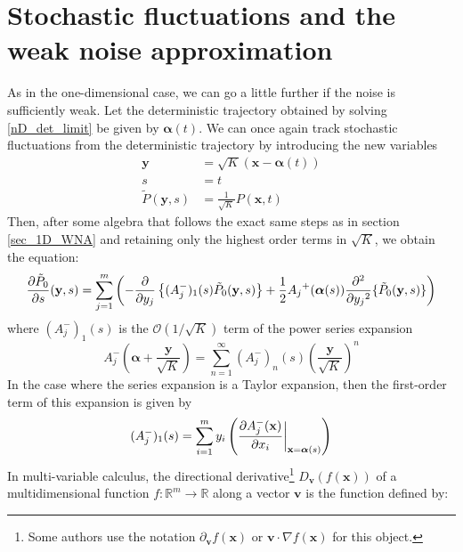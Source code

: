 \section{Stochastic fluctuations and the weak noise approximation}

As in the one-dimensional case, we can go a little further if the noise is sufficiently weak. Let the deterministic trajectory obtained by solving \eqref{nD_det_limit} be given by $\boldsymbol{\alpha}(t)$.  We can once again track 
stochastic fluctuations from the deterministic trajectory by introducing the new variables
\begin{equation}
\begin{aligned}
\mathbf{y} &= \sqrt{K}(\mathbf{x} - \boldsymbol{\alpha}(t))\\
s&=t\\
\tilde{P}(\mathbf{y},s) &= \frac{1}{\sqrt{K}}P(\mathbf{x},t)
\end{aligned}
\end{equation}
Then, after some algebra that follows the exact same steps as in section \ref{sec_1D_WNA} and retaining only the highest order terms in $\sqrt{K}$, we obtain the equation:
\begin{equation}
\label{nD_WNA_intermediate}
\frac{\partial \Tilde{P}_{0}}{\partial s}(\mathbf{y},s) = \sum\limits_{j=1}^{m}\left(-\frac{\partial}{\partial y_j}\left\{(A^{-}_{j})_{1}(s)\Tilde{P}_{0}(\mathbf{y},s)\right\}+\frac{1}{2}{A_j}^{+}(\boldsymbol{\alpha}(s))\frac{\partial^2}{\partial{y_j}^2}\{\Tilde{P}_{0}(\mathbf{y},s)\}\right)
\end{equation}
where $(A^{-}_{j})_{1}(s)$ is the $\mathcal{O}(1/\sqrt{K})$ term of the power series expansion
\begin{equation*}
A^-_{j}(\boldsymbol{\alpha} + \frac{\mathbf{y}}{\sqrt{K}}) = \sum\limits_{n=1}^{\infty}(A^{-}_{j})_{n}(s)\left(\frac{\mathbf{y}}{\sqrt{K}}\right)^n
\end{equation*}
In the case where the series expansion is a Taylor expansion, then the first-order term of this expansion is given by
\begin{equation}
\label{nD_WNA_taylor_term}
(A^{-}_{j})_{1}(s) = \sum\limits_{i=1}^{m} y_i\left(\frac{\partial A^{-}_j(\mathbf{x})}{\partial x_i}\bigg{|}_{\mathbf{x}=\boldsymbol{\alpha}(s)}\right)
\end{equation}
In multi-variable calculus, the directional derivative\footnote{Some authors use the notation $\partial_{\mathbf{v}}f(\mathbf{x})$ or $\mathbf{v}\cdot\nabla f(\mathbf{x})$ for this object.} $D_{\mathbf{v}}(f(\mathbf{x}))$ of a multidimensional function $f: \mathbb{R}^m \to \mathbb{R}$ along a vector $\mathbf{v}$ is the function defined by:
